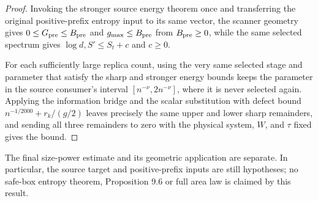 \begin{proof}
    \leanok
    Invoking the stronger source energy theorem once and transferring the original
    positive-prefix entropy input to its same vector, the scanner geometry
    gives $0\leq G_{\rm pre}\leq B_{\rm pre}$ and
    $g_{\max}\leq B_{\rm pre}$ from $B_{\rm pre}\geq0$, while
    the same selected spectrum gives
    $\log d,S'\leq S_t+c$ and $c\geq0$.

    For each sufficiently large replica count, using the very same selected
    stage and parameter that satisfy the sharp and stronger energy bounds
    keeps the parameter in the source consumer's interval
    $[n^{-\nu},2n^{-\nu}]$, where it is never selected again.
    Applying the information bridge and the scalar substitution with
    defect bound $n^{-1/2000}+r_k/(g/2)$ leaves precisely
    the same upper and lower sharp remainders, and sending all three remainders
    to zero with the physical system, $W$, and $\tau$ fixed gives the bound.
\end{proof}

The final size-power estimate and its geometric application are separate.
In particular, the source target and positive-prefix inputs are still
hypotheses; no safe-box entropy theorem, Proposition 9.6 or full area law is
claimed by this result.
